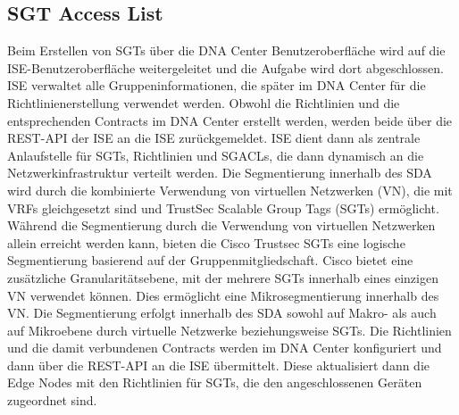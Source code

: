 \subsection{SGT Access List}
Beim Erstellen von SGTs über die DNA Center Benutzeroberfläche wird auf die ISE-Benutzer\-ober\-fläche weitergeleitet und die Aufgabe wird dort abgeschlossen. ISE verwaltet alle Gruppeninformationen, die später im DNA Center für die Richtlinienerstellung verwendet werden. Obwohl die Richtlinien und die entsprechenden Contracts im DNA Center erstellt werden, werden beide über die REST-API der ISE an die ISE zurückgemeldet. ISE dient dann als zentrale Anlaufstelle für SGTs, Richtlinien und SGACLs, die dann dynamisch an die Netzwerkinfrastruktur verteilt werden.
Die Segmentierung innerhalb des SDA wird durch die kombinierte Verwendung von virtuellen Netzwerken (VN), die mit VRFs gleichgesetzt sind und TrustSec Scalable Group Tags (SGTs) ermöglicht. Während die Segmentierung durch die Verwendung von virtuellen Netzwerken allein erreicht werden kann, bieten die Cisco Trustsec SGTs eine logische Segmentierung basierend auf der Gruppenmitgliedschaft. Cisco bietet eine zusätzliche Granularitätsebene, mit der mehrere SGTs innerhalb eines einzigen VN verwendet können. Dies ermöglicht eine Mikrosegmentierung innerhalb des VN. Die Segmentierung erfolgt innerhalb des SDA sowohl auf Makro- als auch auf Mikroebene durch virtuelle Netzwerke beziehungsweise SGTs. Die Richtlinien und die damit verbundenen Contracts werden im DNA Center konfiguriert und dann über die REST-API an die ISE übermittelt. Diese aktualisiert dann die Edge Nodes mit den Richtlinien für SGTs, die den angeschlossenen Geräten zugeordnet sind. 
\cite{sda-segmentation-may2018}

